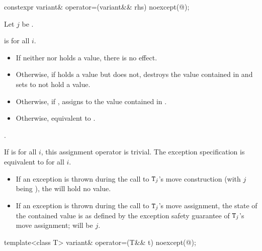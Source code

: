 %
\begin{itemdecl}
constexpr variant& operator=(variant&& rhs) noexcept(@\seebelow@);
\end{itemdecl}

\begin{itemdescr}
\pnum
Let $j$ be .

\pnum
\constraints
{}
 is
 for all $i$.

\pnum
\effects
\begin{itemize}
\item
If neither  nor  holds a value, there is no effect.
\item
Otherwise, if  holds a value but  does not, destroys the value
contained in  and sets  to not hold a value.
\item
Otherwise, if , assigns  to
the value contained in .
\item
Otherwise, equivalent to .
\end{itemize}

\pnum
\returns
{}.

\pnum
\remarks
If 
is  for all $i$, this assignment operator is trivial.
The exception specification is equivalent to
 for all $i$.
\begin{itemize}
\item If an exception is thrown during the call to $\texttt{T}_j$'s move construction
(with $j$ being ), the  will hold no value.
\item If an exception is thrown during the call to $\texttt{T}_j$'s move assignment,
the state of the contained value is as defined by the exception safety
guarantee of $\texttt{T}_j$'s move assignment;  will be $j$.
\end{itemize}
\end{itemdescr}

%
\begin{itemdecl}
template<class T> variant& operator=(T&& t) noexcept(@\seebelow@);
\end{itemdecl}

